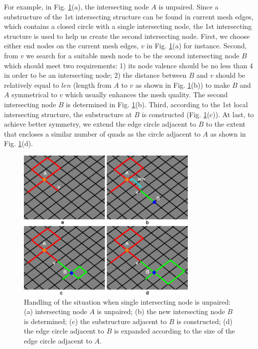 \documentclass[final,5p,times,twocolumn]{elsarticle}
\begin{document}
For example, in Fig. \ref{fig:create_int_node}(a), the intersecting node $A$ is unpaired. Since a substructure of the 1st intersecting structure can be found in current mesh edges, which contains a closed circle with a single intersecting node, the 1st intersecting structure is used to help us create the second intersecting node. First, we choose either end nodes on the current mesh edges, $v$ in Fig. \ref{fig:create_int_node}(a) for instance. Second, from $v$ we search for a suitable mesh node to be the second intersecting node $B$ which should meet two requirements: 1) its node valence should be no less than 4 in order to be an intersecting node; 2) the distance between $B$ and $v$ should be relatively equal to $len$ (length from $A$ to $v$ as shown in Fig. \ref{fig:create_int_node}(b)) to make $B$ and $A$ symmetrical to $v$ which usually enhances the mesh quality. The second intersecting node $B$ is determined in Fig. \ref{fig:create_int_node}(b). Third, according to the 1st local intersecting structure, the substructure at $B$ is constructed (Fig. \ref{fig:create_int_node}(c)). At last, to achieve better symmetry, we extend the edge circle adjacent to $B$ to the extent that encloses a similar number of quads as the circle adjacent to $A$ as shown in Fig. \ref{fig:create_int_node}(d).

\begin{figure}[htbp]
\begin{center}
\includegraphics[width=8.7cm]{rev_figures/create_int_node.png}
\caption{Handling of the situation when single intersecting node is unpaired: (a) intersecting node $A$ is unpaired; (b) the new intersecting node $B$ is determined; (c) the substructure adjacent to $B$ is constructed; (d) the edge circle adjacent to $B$ is expanded according to the size of the edge circle adjacent to $A$.}
\label{fig:create_int_node}
\end{center}
\end{figure}
\end{document}
